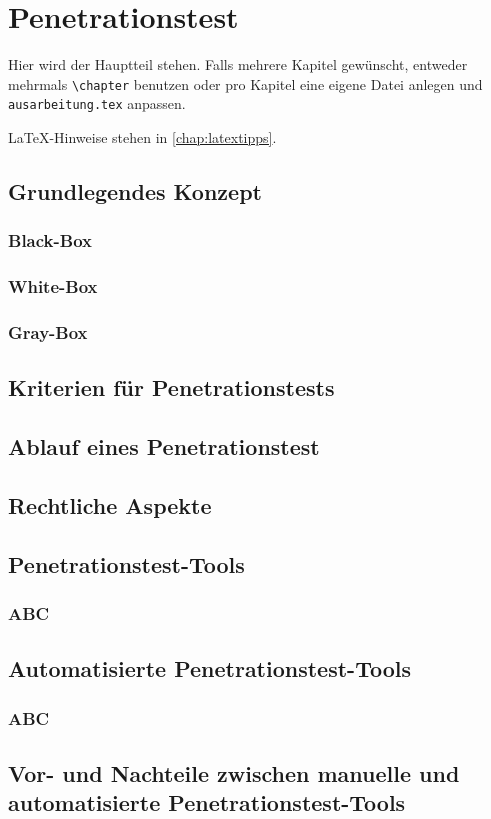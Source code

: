 \chapter{Penetrationstest}
\label{chap:k2}

Hier wird der Hauptteil stehen. Falls mehrere Kapitel gewünscht, entweder mehrmals \texttt{\textbackslash{}chapter} benutzen oder pro Kapitel eine eigene Datei anlegen und \texttt{ausarbeitung.tex} anpassen.

LaTeX-Hinweise stehen in \cref{chap:latextipps}.

\section{Grundlegendes Konzept}

\subsection{Black-Box}

\subsection{White-Box}

\subsection{Gray-Box}

\section{Kriterien für Penetrationstests}

\section{Ablauf eines Penetrationstest}

\section{Rechtliche Aspekte}

\section{Penetrationstest-Tools}

\subsection{ABC}

\section{Automatisierte Penetrationstest-Tools}

\subsection{ABC}

\section{Vor- und Nachteile zwischen manuelle und automatisierte Penetrationstest-Tools}